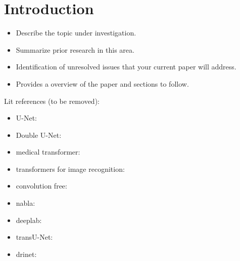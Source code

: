 \section{Introduction}

\begin{itemize}
  \item Describe the topic under investigation.
  \item Summarize prior research in this area.
  \item Identification of unresolved issues that your current paper will address.
  \item Provides a overview of the paper and sections to follow.
\end{itemize}


Lit references (to be removed):
\begin{itemize}
  \item U-Net: \citep{unet-2015-ronneberger}
  \item Double U-Net: \citep{double_unet-2020-jha}
  \item medical transformer: \citep{medical_transformer-2021-valanarasu}
  \item transformers for image recognition: \citep{transformers-2020-dosovitskiy}
  \item convolution free: \citep{convolution_free-2021-karimi}
  \item nabla: \citep{nabla-2019-alom}
  \item deeplab: \citep{deeplab-2016-chen}
  \item transU-Net: \citep{transunet-2021-chen}
  \item drinet: \citep{drinet-2018-chen}
\end{itemize}

